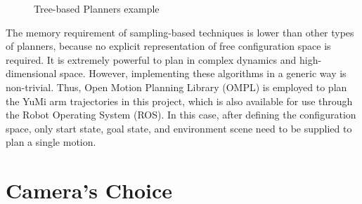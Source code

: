 \begin{figure}[H]
\centering
{}
\caption{Tree-based Planners example \citep{OMPLPrim20:online}}
\label{tree}
\end{figure}

The memory requirement of sampling-based techniques is lower than other types of planners, because no explicit representation of free configuration space is required. It is extremely powerful to plan in complex dynamics and high-dimensional space. However, implementing these algorithms in a generic way is non-trivial. Thus, Open Motion Planning Library (OMPL) \citep{OMPL} is employed to plan the YuMi arm trajectories in this project, which is also available for use through the Robot Operating System (ROS).
In this case, after defining the configuration space, only start state, goal state, and environment scene need to be supplied to plan a single motion. 

\section{Camera's Choice}

